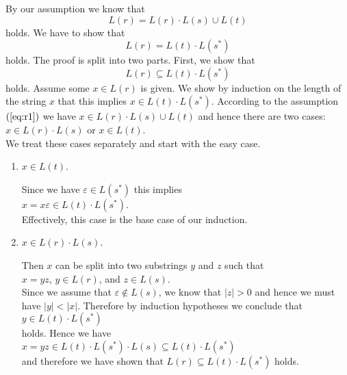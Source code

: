 \proofEng
By our assumption we know that 
\begin{equation}
  \label{eq:r1}
  L(r) = L(r) \cdot L(s) \cup L(t)  
\end{equation}
holds.  We have to show that 
\begin{equation}
  \label{eq:r2}
  L(r) = L(t) \cdot L(s^*)  
\end{equation}
holds.  The proof is  split into two parts.  First, we show that
\begin{equation}
  \label{eq:r3}
  L(r) \subseteq L(t) \cdot L(s^*)  
\end{equation}
holds.  Assume some $x \in L(r)$ is given.  We show by induction on the length of the string $x$
that this implies $x \in L(t) \cdot L(s^*)$.   According to the assumption  $(\ref{eq:r1})$ we have
$x \in L(r) \cdot L(s) \cup L(t)$ and hence there are two cases:
\\[0.2cm]
\hspace*{1.3cm}
$x \in L(r) \cdot L(s)$ \quad or \quad $x \in L(t)$.
\\[0.2cm]
We treat these cases separately and start with the easy case.
\begin{enumerate}
\item $x \in L(t)$.

      Since we have  $\varepsilon \in L(s^*)$ this implies
      \\[0.2cm]
      \hspace*{1.3cm}
      $x = x\varepsilon \in L(t) \cdot L(s^*)$.
      \\[0.2cm]
      Effectively, this case is the base case of our induction.
\item $x \in L(r) \cdot L(s)$.

      Then  $x$ can be split into two substrings $y$ and $z$ such that
      \\[0.2cm]
      \hspace*{1.3cm}
      $x = yz$, \quad $y \in L(r)$, \quad and \quad  $z \in L(s)$.
      \\[0.2cm]
      Since we assume that $\varepsilon \not\in L(s)$, we know that  $|z|>0$ and hence we must have
      $|y| < |x|$.  Therefore by induction hypotheses we conclude that
      \\[0.2cm]
      \hspace*{1.3cm}
      $y \in L(t) \cdot L(s^*)$
      \\[0.2cm]
      holds.  Hence we have
      \\[0.2cm]
      \hspace*{1.3cm}
      $x = yz \in L(t) \cdot L(s^*) \cdot L(s) \subseteq L(t) \cdot L(s^*)$
      \\[0.2cm]
      and therefore we have shown that $L(r) \subseteq L(t) \cdot L(s^*)$ holds.
\end{enumerate}
